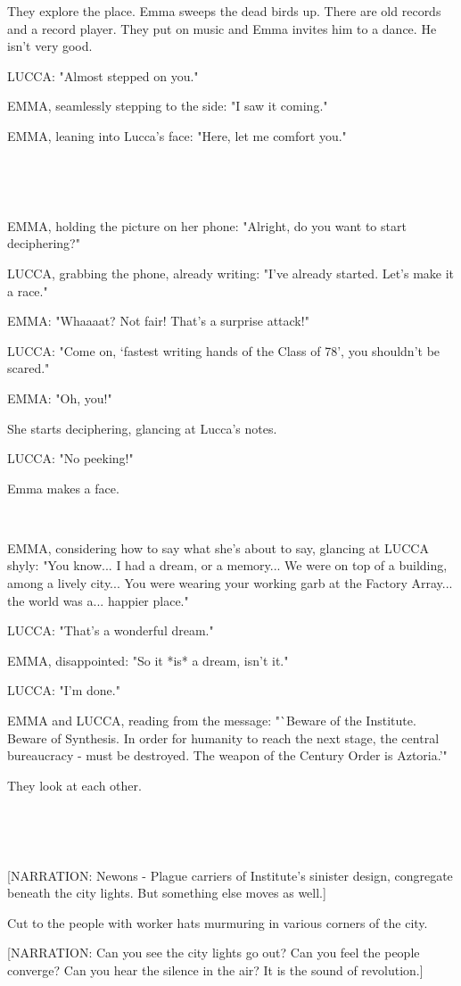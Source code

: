 \documentclass[11pt]{article}
\begin{document}
They explore the place.
Emma sweeps the dead birds up.
There are old records and a record player.
They put on music and Emma invites him to a dance.
He isn't very good. 

LUCCA: "Almost stepped on you."

EMMA, seamlessly stepping to the side: "I saw it coming."

EMMA, leaning into Lucca's face: "Here, let me comfort you."

\ 

\ 

EMMA, holding the picture on her phone: "Alright, do you want to start deciphering?"

LUCCA, grabbing the phone, already writing: "I've already started. Let's make it a race."

EMMA: "Whaaaat? Not fair! That's a surprise attack!"

LUCCA: "Come on, `fastest writing hands of the Class of 78', you shouldn't be scared."

EMMA: "Oh, you!"

She starts deciphering, glancing at Lucca's notes.

LUCCA: "No peeking!" 

Emma makes a face.

\ 

EMMA, considering how to say what she's about to say, glancing at LUCCA shyly: "You know...
I had a dream, or a memory...
We were on top of a building, among a lively city...
You were wearing your working garb at the Factory Array...
the world was a... happier place."

LUCCA: "That's a wonderful dream."

EMMA, disappointed: "So it *is* a dream, isn't it."

LUCCA: "I'm done."

EMMA and LUCCA, reading from the message: "`Beware of the Institute. 
Beware of Synthesis.
In order for humanity to reach the next stage, the central bureaucracy - must be destroyed.
The weapon of the Century Order is Aztoria.'"

They look at each other.

\ 

\ 

[NARRATION: Newons - Plague carriers of Institute's sinister design, congregate beneath the city lights. 
But something else moves as well.]

Cut to the people with worker hats murmuring in various corners of the city.

[NARRATION: Can you see the city lights go out?
Can you feel the people converge?
Can you hear the silence in the air?
It is the sound of revolution.]
\end{document}
